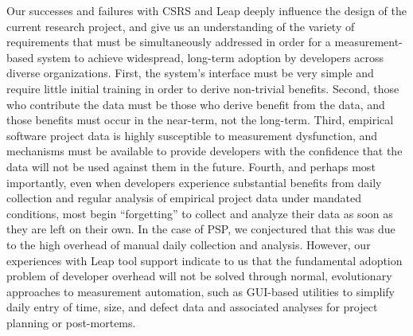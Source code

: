 \medskip

Our successes and failures with CSRS and Leap deeply influence the design
of the current research project, and give us an understanding of the
variety of requirements that must be simultaneously addressed in order for
a measurement-based system to achieve widespread, long-term adoption by
developers across diverse organizations. First, the system's interface must
be very simple and require little initial training in order to derive
non-trivial benefits. Second, those who contribute the data must be those
who derive benefit from the data, and those benefits must occur in the
near-term, not the long-term.  Third, empirical software project data is
highly susceptible to measurement dysfunction, and mechanisms must be
available to provide developers with the confidence that the data will not
be used against them in the future. Fourth, and perhaps most importantly,
even when developers experience substantial benefits from daily collection
and regular analysis of empirical project data under mandated conditions,
most begin ``forgetting'' to collect and analyze their data as soon as they
are left on their own. In the case of PSP, we conjectured that this was due
to the high overhead of manual daily collection and analysis.  However, our
experiences with Leap tool support indicate to us that the fundamental
adoption problem of developer overhead will not be solved through normal,
evolutionary approaches to measurement automation, such as GUI-based
utilities to simplify daily entry of time, size, and defect data and
associated analyses for project planning or post-mortems.
 


















